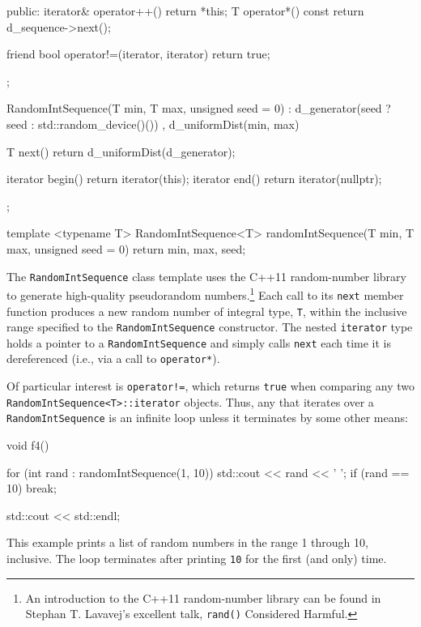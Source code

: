 {{\begin{emcppslisting}[emcppsbatch=e2]
{{    public:
        iterator& operator++() { return *this; }
        T operator*() const { return d_sequence->next(); }

        friend bool operator!=(iterator, iterator) { return true; }
    };

    RandomIntSequence(T min, T max, unsigned seed = 0)
        : d_generator(seed ? seed : std::random_device()())
        , d_uniformDist(min, max) { }

    T next() { return d_uniformDist(d_generator); }

    iterator begin() { return iterator(this); }
    iterator end()   { return iterator(nullptr); }
};

template <typename T>
RandomIntSequence<T> randomIntSequence(T min, T max, unsigned seed = 0)
{
    return {min, max, seed};
}
\end{emcppslisting}


\noindent The \lstinline!RandomIntSequence! class template uses the C++11
random-number library to generate high-quality pseudorandom
numbers.{\cprotect\footnote{An introduction to the C++11 random-number
library can be found in Stephan T. Lavavej's excellent talk,
  \lstinline!rand()! Considered Harmful.}} Each call to its \lstinline!next!
member function produces a new random number of integral type,
\lstinline!T!, within the inclusive range specified to the
\lstinline!RandomIntSequence! constructor. The nested \lstinline!iterator!
type holds a pointer to a \lstinline!RandomIntSequence! and simply calls
\lstinline!next! each time it is dereferenced (i.e., via a call to
\lstinline!operator*!).

Of particular interest is \lstinline|operator!=|, which returns
\lstinline!true! when comparing any two
\lstinline!RandomIntSequence<T>::iterator! objects. Thus, any
 that iterates over a
\lstinline!RandomIntSequence! is an infinite loop unless it terminates by
some other means:

\begin{emcppslisting}[emcppsbatch=e2]
void f4()
{
    for (int rand : randomIntSequence(1, 10))
    {
        std::cout << rand << ' ';
        if (rand == 10) { break; }
    }

    std::cout << std::endl;
}
\end{emcppslisting}


\noindent This example prints a list of random numbers in the range 1 through 10,
inclusive. The loop terminates after printing \lstinline!10! for the first
(and only) time.

}}
